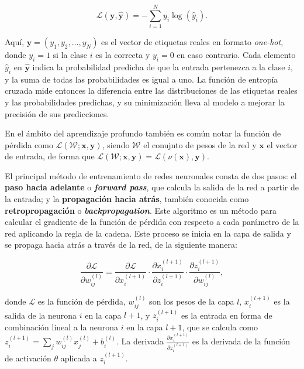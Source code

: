 \[
\mathcal{L}(\mathbf{y}, \mathbf{\hat{y}}) = -\sum_{i=1}^{N} y_i \log(\hat{y}_i).
\]

Aquí, \(\mathbf{y} = (y_1, y_2, \ldots, y_N)\) es el vector de etiquetas reales en formato \textit{one-hot}, donde \(y_i = 1\) si la clase \(i\) es la correcta y \(y_i = 0\) en caso contrario. Cada elemento \(\hat{y}_i\) en \(\mathbf{\hat{y}}\) indica la probabilidad predicha de que la entrada pertenezca a la clase \(i\), y la suma de todas las probabilidades es igual a uno. La función de entropía cruzada mide entonces la diferencia entre las distribuciones de las etiquetas reales y las probabilidades predichas, y su minimización lleva al modelo a mejorar la precisión de sus predicciones.

En el ámbito del aprendizaje profundo también es común notar la función de pérdida como \(\mathcal{L}(\mathcal{W};\mathbf{x}, \mathbf{y})\), siendo \(\mathcal{W}\) el conujnto de pesos de la red y \(\mathbf{x}\) el vector de entrada, de forma que \(\mathcal{L}(\mathcal{W};\mathbf{x}, \mathbf{y}) = \mathcal{L}(\nu(\mathbf{x}), \mathbf{y})\).

El principal método de entrenamiento de redes neuronales consta de dos pasos: el \textbf{paso hacia adelante} o \textbf{\textit{forward pass}}, que calcula la salida de la red a partir de la entrada; y la \textbf{propagación hacia atrás}, también conocida como \textbf{retropropagación} o \textbf{\textit{backpropagation}}. Este algoritmo es un método para calcular el gradiente de la función de pérdida con respecto a cada parámetro de la red aplicando la regla de la cadena. Este proceso se inicia en la capa de salida y se propaga hacia atrás a través de la red, de la siguiente manera:

\[
\frac{\partial \mathcal{L}}{\partial w_{ij}^{(l)}} = \frac{\partial \mathcal{L}}{\partial x_i^{(l+1)}} \cdot \frac{\partial x_i^{(l+1)}}{\partial z_i^{(l+1)}} \cdot \frac{\partial z_i^{(l+1)}}{\partial w_{ij}^{(l)}},
\]

donde \( \mathcal{L} \) es la función de pérdida, \( w_{ij}^{(l)} \) son los pesos de la capa \( l \), \( x_i^{(l+1)} \) es la salida de la neurona \( i \) en la capa \( l+1 \), y \( z_i^{(l+1)} \) es la entrada en forma de combinación lineal a la neurona \( i \) en la capa \( l+1 \), que se calcula como \( z_i^{(l+1)} = \sum_j w_{ij}^{(l)} x_j^{(l)} + b_i^{(l)} \). La derivada \(\frac{\partial x_i^{(l+1)}}{\partial z_i^{(l+1)}}\) es la derivada de la función de activación \(\theta\) aplicada a \( z_i^{(l+1)} \).

